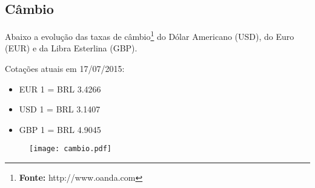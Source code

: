 \documentclass[../../relatorio.tex]{subfiles}
\begin{document}
\pagebreak
\subsection{Câmbio}


Abaixo a evolução das taxas de câmbio\footnote{\textbf{Fonte:} http://www.oanda.com} do Dólar Americano (USD), do Euro (EUR) e da Libra Esterlina (GBP).

Cotações atuais em 17/07/2015:

\begin{itemize}
  \item EUR 1 = BRL 3.4266
  \item USD 1 = BRL 3.1407
  \item GBP 1 = BRL 4.9045
\end{itemize}

\begin{figure}[ht]
  \begin{minipage}{0.70\textheight}
    \centering
      \texttt{[image: cambio.pdf]}
  \end{minipage}
\end{figure}

\pagebreak
\end{document}
